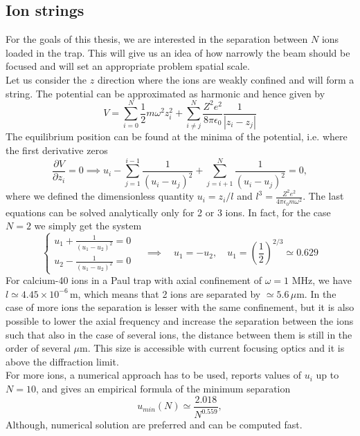 \subsection{Ion strings}
\label{ionstrings}
For the goals of this thesis, we are interested in the separation between $N$ ions loaded in the trap. This will give us an idea of how narrowly the beam should be focused and will set an appropriate problem spatial scale.\\
Let us consider the $z$ direction where the ions are weakly confined and will form a string. The potential can be approximated as harmonic and hence given by
\begin{equation}
V = \sum_{i=0}^N \frac{1}{2}m\omega^2z_i^2 + \sum_{i\neq j}^N\frac{Z^2e^2}{8\pi \epsilon_0}\frac{1}{|z_i-z_j|}
\end{equation}
The equilibrium position can be found at the minima of the potential, i.e. where the first derivative zeros
\begin{equation}
\frac{\partial V}{\partial z_i} = 0 \implies u_i - \sum_{j=1}^{i-1} \frac{1}{(u_i-u_j)^2} + \sum_{j= i+1}^{N} \frac{1}{(u_i-u_j)^2}= 0,
\end{equation}
where we defined the dimensionless quantity $u_i = z_i/l$ and $l^3 = \displaystyle\frac{Z^2 e^2 }{4\pi \epsilon_0 m\omega^2}$.
The last equations can be solved analytically only for 2 or 3 ions. In fact, for the case $N=2$ we simply get the system
\begin{equation}
\begin{cases}
  u_1 + \frac{1}{(u_1-u_2)^2} = 0\\
  u_2 - \frac{1}{(u_1-u_2)^2} = 0
  \end{cases} \quad \implies \quad u_1 = -u_2,\quad  u_1 = \left(\frac{1}{2}\right)^{2/3} \simeq 0.629
\end{equation}
For calcium-40 ions in a Paul trap with axial confinement of $\omega = 1$ MHz, we have $l \simeq 4.45\times 10^{-6}\,$m, which means that 2 ions are separated by $\simeq 5.6\, \mu$m. In the case of more ions the separation is lesser with the same confinement, but it is also possible to lower the axial frequency and increase the separation between the ions such that also in the case of several ions, the distance between them is still in the order of several $\mu$m. This size is accessible with current focusing optics and it is above the diffraction limit.\\
For more ions, a numerical approach has to be used, \cite{ion_spacing} reports values of $u_i$ up to $N=10$, and gives an empirical formula of the minimum separation
\begin{equation}
u_{min}(N) \simeq \frac{2.018}{N^{0.559}},
\end{equation}
Although, numerical solution are preferred and can be computed fast.
